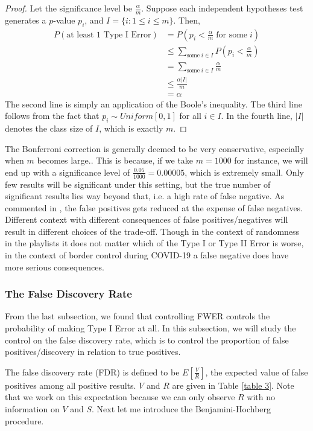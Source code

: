 \documentclass[12pt]{article}
\theoremstyle{plain}
\theoremstyle{definition}
\theoremstyle{remark}
\begin{document}
\begin{proof}\cite{5.3}
Let the significance level be $\frac{\alpha}{m}$. Suppose each independent hypotheses test generates a $p$-value $p_i$, and $I=\{i:1\leq i\leq m\}$. Then,
\begin{align*}
    P(\text{at least 1 Type I Error})&=P(p_i<\frac{\alpha}{m}\; \text{for some} \;i)\\
    &\leq\sum_{\text{some}\; i\in I} P(p_i<\frac{\alpha}{m})\\
    &=\sum_{\text{some}\; i\in I}\frac{\alpha}{m}\\
    &\leq\frac{\alpha|I|}{m}\\
    &=\alpha
\end{align*}
The second line is simply an application of the Boole's inequality. The third line follows from the fact that $p_i\sim Uniform[0,1]$ for all $i\in I$. In the fourth line, $|I|$ denotes the class size of $I$, which is exactly $m$. 
\end{proof}

The Bonferroni correction is generally deemed to be very conservative, especially when $m$ becomes large.\cite{5.4}\cite{5.1}\cite{5.3}\cite{5.5}. This is because, if we take $m=1000$ for instance, we will end up with a significance level of $\frac{0.05}{1000}=0.00005$, which is extremely small. Only few results will be significant under this setting, but the true number of significant results lies way beyond that, i.e. a high rate of false negative. As commented in \cite{5.5}, the false positives gets reduced at the expense of false negatives. Different context with different consequences of false positives/negatives will result in different choices of the trade-off. Though in the context of randomness in the playlists it does not matter which of the Type I or Type II Error is worse, in the context of border control during COVID-19 a false negative does have more serious consequences.

\newpage
\subsubsection{The False Discovery Rate}
From the last subsection, we found that controlling FWER controls the probability of making Type I Error at all. In this subsection, we will study the control on the false discovery rate, which is to control the proportion of false positives/discovery in relation to true positives. 

The false discovery rate (FDR) is defined to be $E[\frac{V}{R}]$, the expected value of false positives among all positive results. $V$ and $R$ are given in Table \ref{table 3}. Note that we work on this expectation because we can only observe $R$ with no information on $V$ and $S$.\cite{5.3} Next let me introduce the Benjamini-Hochberg procedure.
\end{document}

